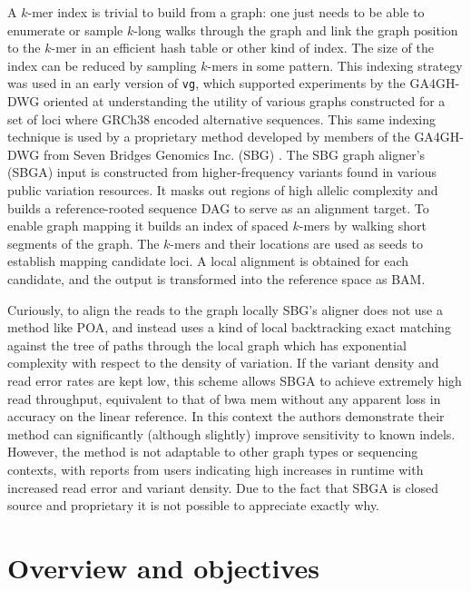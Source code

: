 A $k$-mer index is trivial to build from a graph: one just needs to be able to enumerate or sample $k$-long walks through the graph and link the graph position to the $k$-mer in an efficient hash table or other kind of index.
The size of the index can be reduced by sampling $k$-mers in some pattern.
This indexing strategy was used in an early version of {\tt vg}, which supported experiments by the GA4GH-DWG \cite{novak2017genome} oriented at understanding the utility of various graphs constructed for a set of loci where GRCh38 encoded alternative sequences.
This same indexing technique is used by a proprietary method developed by members of the GA4GH-DWG from Seven Bridges Genomics Inc. (SBG) \cite{rakocevic2018fast}.
The SBG graph aligner's (SBGA) input is constructed from higher-frequency variants found in various public variation resources.
It masks out regions of high allelic complexity and builds a reference-rooted sequence DAG to serve as an alignment target.
To enable graph mapping it builds an index of spaced $k$-mers by walking short segments of the graph.
The $k$-mers and their locations are used as seeds to establish mapping candidate loci.
A local alignment is obtained for each candidate, and the output is transformed into the reference space as BAM.

Curiously, to align the reads to the graph locally SBG's aligner does not use a method like POA, and instead uses a kind of local backtracking exact matching against the tree of paths through the local graph which has exponential complexity with respect to the density of variation.
If the variant density and read error rates are kept low, this scheme allows SBGA to achieve extremely high read throughput, equivalent to that of bwa mem without any apparent loss in accuracy on the linear reference.
In this context the authors demonstrate their method can significantly (although slightly) improve sensitivity to known indels.
However, the method is not adaptable to other graph types or sequencing contexts, with reports from users indicating high increases in runtime with increased read error and variant density.
Due to the fact that SBGA is closed source and proprietary it is not possible to appreciate exactly why.

\section{Overview and objectives}

